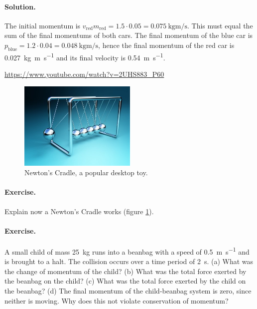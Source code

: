 \documentclass[a4paper]{amsbook}
\newcommand\capcite[1]{}
\begin{document}
\paragraph{Solution.} The initial momentum is $ v_{\text{red}} m_{\text{red}} = 1.5 \cdot 0.05 = \SI{0.075}{\kilo\gram\metre\per\second} $.
This must equal the sum of the final momentums of both cars. The final momentum of the blue car is $ p_{\text{blue}} = 1.2 \cdot 0.04 =
\SI{0.048}{\kilo\gram\metre\per\second} $, hence the final momentum of the red car is \SI{0.027}{\kilo\gram\metre\per\second} and its
final velocity is \SI{0.54}{\metre\per\second}.

\begin{center}
\begin{tcolorbox}[width=0.8\textwidth,colback={red},title={\textbf{Go and watch...}},colbacktitle=yellow,coltitle=blue]
  \textcolor{white}{\url{https://www.youtube.com/watch?v=2UHS883_P60}}
\end{tcolorbox}
\end{center}

\begin{figure}
  \centering
  \includegraphics[width=0.5\textwidth]{newtoncradle}
  \caption{Newton's Cradle, a popular desktop toy. \capcite{http://images.tutorvista.com/cms/images/95/conservation-of-momentum-experiment1.jpg}\label{fig:babynewton}}
\end{figure}

\paragraph{Exercise.} Explain now a Newton's Cradle works (figure \ref{fig:babynewton}).

\paragraph{Exercise.} A small child of mass \SI{25}{\kilo\gram} runs into a beanbag with a speed of \SI{0.5}{\metre\per\second} and is brought to a
halt. The collision occurs over a time period of \SI{2}{\second}. (a) What was the change of momentum of the child? (b) What was the total force
exerted by the beanbag on the child? (c) What was the total force exerted by the child on the beanbag? (d) The final momentum of the child-beanbag
system is zero, since neither is moving. Why does this not violate conservation of momentum?
\end{document}

